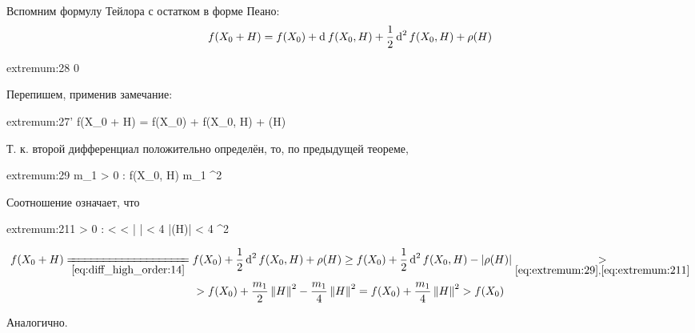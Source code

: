 \begin{eproof}
	\item Вспомним формулу Тейлора с остатком в форме Пеано:
	$$ f(X_0 + H) = f(X_0) + \di f(X_0, H) + \half \di[2] f(X_0, H) + \rho(H) $$
	\begin{equ}{extremum:28}
		   0
	\end{equ}
	Перепишем, применив замечание:
	\begin{equ}{extremum:27'}
		f(X_0 + H) = f(X_0) + \half \di[2] f(X_0, H) + \rho(H)
	\end{equ}
	Т. к. второй дифференциал положительно определён, то, по предыдущей теореме,
	\begin{equ}{extremum:29}
		\exist m_1 > 0 : \di[2] f(X_0, H) \ge m_1 ^2
	\end{equ}
	Соотношение  означает, что
	\begin{equ}{extremum:211}
		\exist \delta > 0 :  <  < \delta \quad \bigg|  \bigg| < 4 \qquad \iff |\rho(H)| < 4 ^2
	\end{equ}
	\begin{multline*}
		f(X_0 + H) \undereq{\eref{diff_high_order:14}} f(X_0) + \half\di[2] f(X_0, H) + \rho(H) \ge f(X_0) + \half \di[2] f(X_0, H) - |\rho(H)| \underset{\eref{extremum:29}, \eref{extremum:211}}> \\
		> f(X_0) + \half[m_1]\norm{H}^2 - \frac{m_1}4\norm{H}^2 = f(X_0) + \frac{m_1}4\norm{H}^2 > f(X_0)
	\end{multline*}

	\item Аналогично.


\end{eproof}
